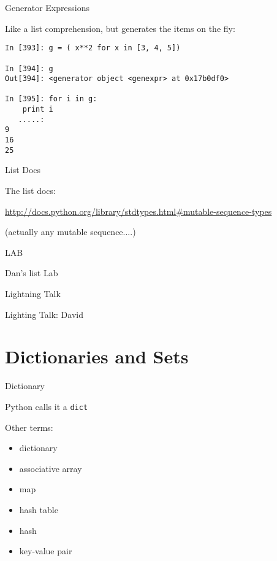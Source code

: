 \documentclass{beamer}
\begin{document}
\begin{frame}[fragile]{Generator Expressions}

{\Large Like a list comprehension, but generates the items on the fly:}

\begin{verbatim}
In [393]: g = ( x**2 for x in [3, 4, 5])

In [394]: g
Out[394]: <generator object <genexpr> at 0x17b0df0>

In [395]: for i in g:
    print i
   .....:     
9
16
25
\end{verbatim}

\end{frame} 



\begin{frame}[fragile]{List Docs}

\vfill
{\Large The list docs:}

\vfill
\url{http://docs.python.org/library/stdtypes.html#mutable-sequence-types}

\vfill
(actually any mutable sequence....)

\end{frame} 



\begin{frame}{LAB}

\vfill
{\LARGE Dan's list Lab}
\vfill

\end{frame}

\begin{frame}{Lightning Talk}

{\center

\LARGE Lighting Talk:
\vfill
David
\vfill

}
\end{frame}

\section{Dictionaries and Sets}

\begin{frame}[fragile]{Dictionary}

{\Large Python calls it a \verb|dict| }

\vfill
{\Large Other terms:}
\begin{itemize}
  \item dictionary
  \item associative array
  \item map
  \item hash table
  \item hash
  \item key-value pair
\end{itemize}

\vfill

\end{frame} 
\end{document}
